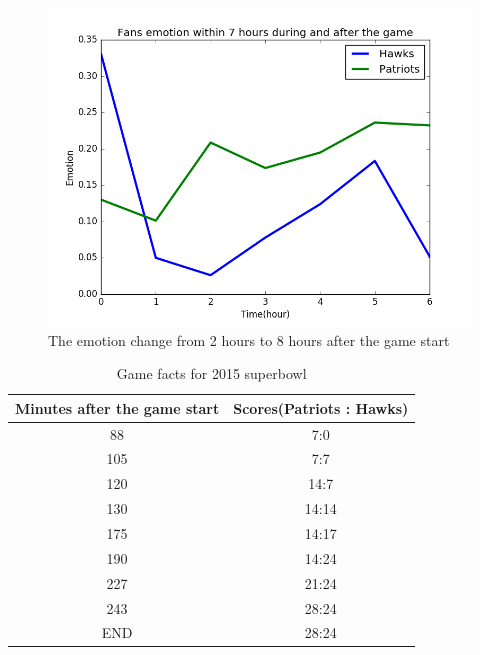 \documentclass{article}
\begin{document}
\begin{figure}[htbp]
\centering
\includegraphics[width=.6\textwidth]{emotion6.png}
\caption{The emotion change from 2 hours to 8 hours after the game start  }
\label{fig:emotion6}
\end{figure}

\begin{table}[hbp]
\caption{Game facts for 2015 superbowl}
\begin{center}
\label{tb:game}
\begin{tabular}{|c|c|}
\hline
Minutes after the game start & Scores(Patriots : Hawks)\\
\hline
88&7:0\\
\hline
105&7:7\\
\hline
120&14:7\\
\hline
130&14:14\\
\hline
175&14:17\\
\hline
190&14:24\\
\hline
227&21:24\\
\hline
243&28:24\\
\hline
END&28:24\\
\hline
\end{tabular}
\end{center}
\end{table}
\end{document}
